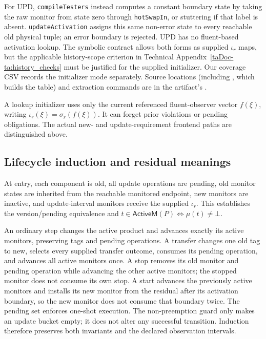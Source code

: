 \documentclass[11pt]{article}
\newcommand{\ActT}{\mathsf{ActiveM}}
\begin{document}
For UPD, \texttt{compileTesters} instead computes a constant boundary state by taking the raw monitor from state zero through \texttt{hotSwapIn}, or stuttering if that label is absent. \texttt{updateActivation} assigns this same non-error state to every reachable old physical tuple; an error boundary is rejected. UPD has no fluent-based activation lookup. The symbolic contract allows both forms as supplied $\iota_r$ maps, but the applicable history-scope criterion in Technical Appendix~\ref{taDoc-ta:history_checks} must be justified for the supplied initializer. Our coverage CSV records the initializer mode separately. Source locations (including , which builds the table) and extraction commands are in the artifact's .

A lookup initializer uses only the current referenced fluent-observer vector $f(\xi)$, writing $\iota_r(\xi)=\sigma_r(f(\xi))$. It can forget prior violations or pending obligations. The actual new- and update-requirement frontend paths are distinguished above.

\subsection{Lifecycle induction and residual meanings}
At entry, each component is old, all update operations are pending, old monitor states are inherited from the reachable monitored endpoint, new monitors are inactive, and update-interval monitors receive the supplied $\iota_r$. This establishes the version/pending equivalence and $t\in\ActT(P)\iff\mu(t)\ne\bot$.

An ordinary step changes the active product and advances exactly its active monitors, preserving tags and pending operations. A transfer changes one old tag to new, selects every supplied transfer outcome, consumes its pending operation, and advances all active monitors once. A stop removes its old monitor and pending operation while advancing the other active monitors; the stopped monitor does not consume its own stop. A start advances the previously active monitors and installs its new monitor from the residual after its activation boundary, so the new monitor does not consume that boundary twice. The pending set enforces one-shot execution. The non-preemption guard only makes an update bucket empty; it does not alter any successful transition. Induction therefore preserves both invariants and the declared observation intervals.
\end{document}
